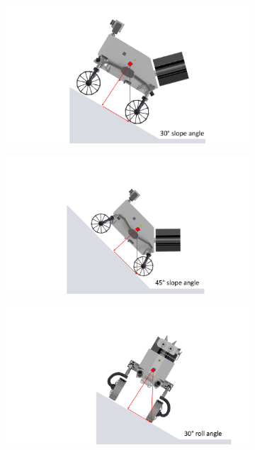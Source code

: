 \begin{figure}[htb]
     \centering
     \begin{subfigure}[b]{0.38\textwidth}
         \centering
         \includegraphics[width=\textwidth]{Media/Static1.pdf}
         \label{fig:stat1}
     \end{subfigure}
     \hfill
     \begin{subfigure}[b]{0.38\textwidth}
         \centering
         \includegraphics[width=\textwidth]{Media/Static4.pdf}
         \label{fig:stat4}
     \end{subfigure}
     \hfill
     \begin{subfigure}[b]{0.38\textwidth}
         \centering
         \includegraphics[width=\textwidth]{Media/Static2.pdf}

\end{subfigure}
\end{figure}
